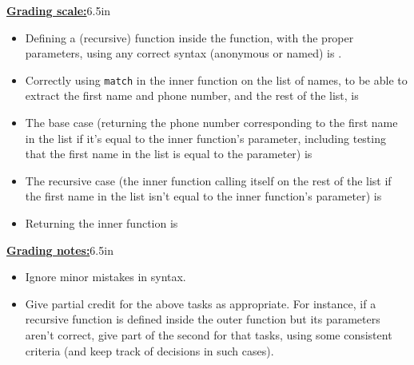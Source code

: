 \documentclass[11pt,fleqn]{article}
\begin{document}
\begin{enumerate}
\begin{info}{\textbf{\underline{Grading scale:}}}{6.5in}
\begin{itemize}
              \item Defining a (recursive) function inside the function, with
                    the proper parameters, using any correct syntax (anonymous
                    or named) is .

              \item Correctly using \texttt{match} in the inner function on
                    the list of names, to be able to extract the first name
                    and phone number, and the rest of the list, is 

              \item The base case (returning the phone number corresponding to
                    the first name in the list if it's equal to the inner
                    function's parameter, including testing that the first
                    name in the list is equal to the parameter) is 

              \item The recursive case (the inner function calling itself on
                    the rest of the list if the first name in the list isn't
                    equal to the inner function's parameter) is 

              \item Returning the inner function is 

            \end{itemize}

          \end{info}

          \begin{info}{\textbf{\underline{Grading notes:}}}{6.5in}

            \begin{itemize}

              \addtolength{\itemsep}{1mm}

              \item Ignore minor mistakes in syntax.

              \item Give partial credit for the above tasks as appropriate.
                    For instance, if a recursive function is defined inside
                    the outer function but its parameters aren't correct,
                    give part of the second  for that tasks, using
                    some consistent criteria (and keep track of decisions in
                    such cases).

            \end{itemize}


\end{info}
\end{enumerate}
\end{document}

